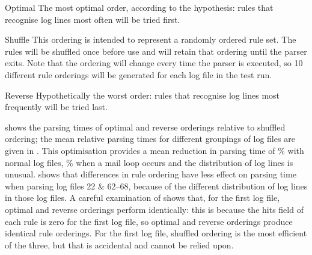 \begin{eqlist}

    \item [Optimal]  The most optimal order, according to the hypothesis:
        rules that recognise log lines most often will be tried first.

    \item [Shuffle] This ordering is intended to represent a randomly
        ordered rule set.  The rules will be shuffled once before use and
        will retain that ordering until the parser exits.  Note that the
        ordering will change every time the parser is executed, so 10
        different rule orderings will be generated for each log file in the
        test run.

    \item [Reverse] Hypothetically the worst order: rules that recognise
        log lines most frequently will be tried last.

\end{eqlist}

 shows the
parsing times of optimal and reverse orderings relative to shuffled
ordering; the mean relative parsing times for different groupings of log
files are given in .  This optimisation provides a mean reduction in parsing time of
\%
with normal log files,
\%
when a mail loop occurs and the distribution of log lines is unusual.
 shows that
differences in rule ordering have less effect on parsing time when parsing
log files 22 \& 62--68, because of the different distribution of log lines
in those log files.  A careful examination of  shows that, for the first log file,
optimal and reverse orderings perform identically: this is because the hits
field of each rule is zero for the first log file, so optimal and reverse
orderings produce identical rule orderings.  For the first log file,
shuffled ordering is the most efficient of the three, but that is
accidental and cannot be relied upon.



